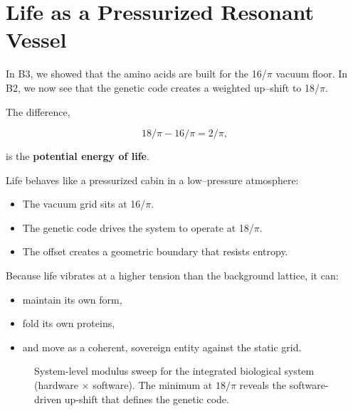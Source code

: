 \documentclass[11pt, letterpaper, openany]{book}
\begin{document}
\section{Life as a Pressurized Resonant Vessel}

In B3, we showed that the amino acids are built for the 16/$\pi$ vacuum floor.
In B2, we now see that the genetic code creates a weighted up–shift to 18/$\pi$.

The difference,



\[
18/\pi - 16/\pi = 2/\pi,
\]



is the \textbf{potential energy of life}.

Life behaves like a pressurized cabin in a low–pressure atmosphere:

\begin{itemize}
    \item The vacuum grid sits at 16/$\pi$.
    \item The genetic code drives the system to operate at 18/$\pi$.
    \item The offset creates a geometric boundary that resists entropy.
\end{itemize}

Because life vibrates at a higher tension than the background lattice, it can:

\begin{itemize}
    \item maintain its own form,
    \item fold its own proteins,
    \item and move as a coherent, sovereign entity against the static grid.
\end{itemize}



\begin{figure}[H]
\centering
{}
\caption{System-level modulus sweep for the integrated biological system (hardware × software). The minimum at $18/\pi$ reveals the software-driven up-shift that defines the genetic code.}
\end{figure}
\end{document}
